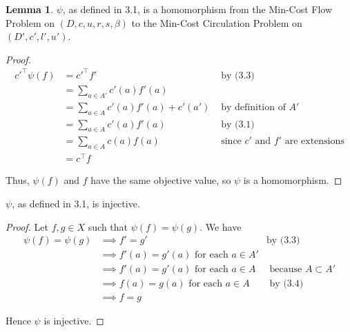 \documentclass[a4paper,10pt, leqno]{article}
\theoremstyle{definition}
\begin{document}
\newtheorem{lemma}{Lemma}
\begin{lemma}
 $\psi$, as defined in 3.1, is a homomorphism from the Min-Cost Flow Problem on $(D, c, u, r, s, \beta)$ to the Min-Cost Circulation Problem on $(D', c', l', u')$.
\end{lemma}
\begin{proof}
\begin{align*}
 {c'}^{\intercal}\psi(f) &= {c'}^{\intercal}f' &\text{ by (3.3)}\\
 &= \sum_{a \in A'}{c'(a)f'(a)} \\
 &= \sum_{a \in A}{c'(a)f'(a)} + c'(a') &\text{ by definition of } A'\\
 &= \sum_{a \in A}{c'(a)f'(a)} &\text{ by (3.1)}\\
 &= \sum_{a \in A}{c(a)f(a)} &\text{ since $c'$ and $f'$ are extensions}\\
 &= c^{\intercal}f
\end{align*}

Thus, $\psi(f)$ and $f$ have the same objective value, so $\psi$ is a homomorphism.
\end{proof}

\begin{proposition}
 $\psi$, as defined in 3.1, is injective.
\end{proposition}
\begin{proof}
 Let $f, g \in X$ such that $\psi(f) = \psi(g)$. We have
 \begin{align*}
  \psi(f) = \psi(g)  &\implies f' = g' &\text{by (3.3)} \\
  &\implies f'(a) = g'(a) \text{ for each } a \in A' \\
  &\implies f'(a) = g'(a) \text{ for each } a \in A &\text{ because } A \subset A' \\
  &\implies f(a) = g(a) \text{ for each } a \in A &\text{ by (3.4)} \\
  &\implies f = g
 \end{align*}

 Hence $\psi$ is injective.
\end{proof}
\end{document}
